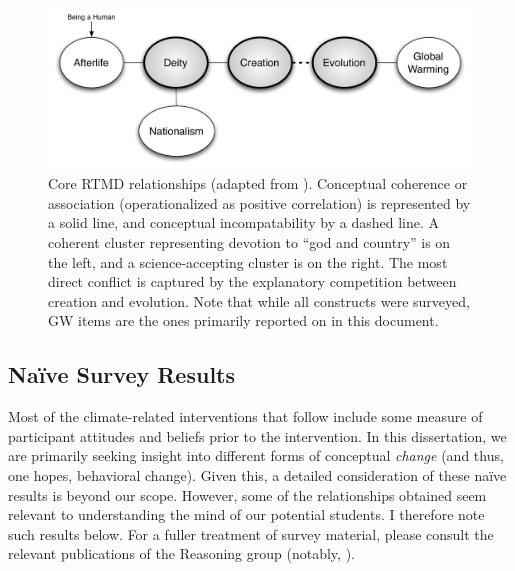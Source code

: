 \begin{figure}
    \includegraphics[width=6.5in]{rtmd.pdf}
    \caption{Core RTMD relationships (adapted from \cite{ranney_why_2012}).
        Conceptual coherence or association (operationalized as positive
        correlation) is represented by a solid line, and conceptual
        incompatability by a dashed line. A coherent cluster representing
        devotion to “god and country” is on the left, and a science-accepting
        cluster is on the right. The most direct conflict is captured by the
        explanatory competition between creation and evolution. Note that while
        all constructs were surveyed, GW items are the ones primarily reported on in this
        document.}
    \label{fig:rtmd}
\end{figure}

\subsection{Na\"ive Survey Results}
\label{sec:naive}

Most of the climate-related interventions that follow include some measure of
participant attitudes and beliefs prior to the intervention. In this
dissertation, we are primarily seeking insight into different forms of
conceptual \emph{change} (and thus, one hopes, behavioral change). Given this, a
detailed consideration of these na\"ive results is beyond our scope. However,
some of the relationships obtained seem relevant to understanding the mind of
our potential students. I therefore note such results below. For a fuller treatment
of survey material, please consult the relevant publications of the Reasoning
group (notably, \cite[Study 1]{cohen_san_2012_f,ranney_changing_2012}).

